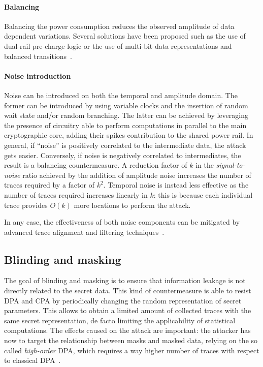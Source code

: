             \paragraph{Balancing}
                Balancing the power consumption reduces the observed amplitude of data dependent variations. Several solutions have been proposed such as the use of dual-rail pre-charge logic or the use of multi-bit data representations and balanced transitions~\cite{kocher2011introduction}. 

            \paragraph{Noise introduction}
                Noise can be introduced on both the temporal and amplitude domain. The former can be introduced by using variable clocks and the insertion of random wait state and/or random branching. The latter can be achieved by leveraging the presence of circuitry able to perform computations in parallel to the main cryptographic core, adding their spikes contribution to the shared power rail. In general, if “noise” is positively correlated to the intermediate data, the attack gets easier. Conversely, if noise is negatively correlated to intermediates, the result is a balancing countermeasure. A reduction factor of $k$ in the \emph{signal-to-noise} ratio achieved by the addition of amplitude noise increases the number of traces required by a factor of $k^2$. Temporal noise is instead less effective as the number of traces required increases linearly in $k$: this is because each individual trace provides $O(k)$ more locations to perform the attack.

                In any case, the effectiveness of both noise components can be mitigated by advanced trace alignment and filtering techniques~\cite{kocher2011introduction}.

        \subsection{Blinding and masking}
            The goal of blinding and masking is to ensure that information leakage is not directly related to the secret data.
            This kind of countermeasure is able to resist DPA and CPA by periodically changing the random representation of secret parameters. This allows to obtain a limited amount of collected traces with the same secret representation, de facto limiting the applicability of statistical computations. The effects caused on the attack are important: the attacker has now to target the relationship between masks and masked data, relying on the so called \emph{high-order} DPA, which requires a way higher number of traces with respect to classical DPA~\cite{kocher2011introduction}.


